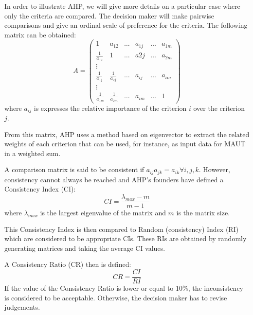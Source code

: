 In order to illustrate AHP, we will give more details on a particular case where only the criteria are compared. The decision maker will make pairwise comparisons and give an ordinal scale of preference for the criteria. The following matrix can be obtained:
\begin{equation}
A=\begin{pmatrix}
1 & a_{12} & \dots & a_{1j} & \dots & a_{1m}\\
\frac{1}{a_{12}} & 1 & \dots & a{2j} & \dots & a_{2m}\\
\vdots \\
\frac{1}{a_{1j}} & \frac{1}{a_{2j}} & \dots & a_{ij} & \dots & a_{im}\\
\vdots \\
\frac{1}{a_{1m}} & \frac{1}{a_{2m}} & \dots & a_{im} & \dots & 1
\end{pmatrix}
\end{equation}
where $a_{ij}$ is expresses the relative importance of the criterion $i$ over the criterion $j$.

From this matrix, AHP uses a method based on eigenvector to extract the related weights of each criterion that can be used, for instance, as input data for MAUT in a weighted sum.

A comparison matrix is said to be consistent if $a_{ij} a_{jk} = a_{ik} \forall i, j, k$. However, consistency cannot always be reached and AHP's founders have defined a Consistency Index (CI):
\begin{equation}
CI = \frac{\lambda_{max}-m}{m-1}
\end{equation}
where $\lambda_{max}$ is the largest eigenvalue of the matrix and $m$ is the matrix size.

This Consistency Index is then compared to Random (consistency) Index (RI) which are considered to be appropriate CIs. These RIs are obtained by randomly generating matrices and taking the average CI values.

A Consistency Ratio (CR) then is defined:
\begin{equation}
CR = \frac{CI}{RI}
\end{equation}
If the value of the Consistency Ratio is lower or equal to 10\%, the inconsistency is considered to be acceptable. Otherwise, the decision maker has to revise judgements.

